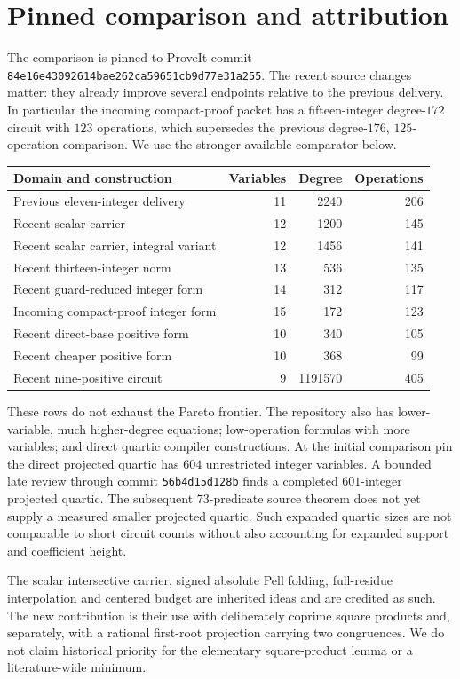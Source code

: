 \section{Pinned comparison and attribution}
The comparison is pinned to ProveIt commit
\texttt{84e16e43092614bae262ca59651cb9d77e31a255}.
The recent source changes matter: they already improve several endpoints
relative to the previous delivery. In particular the incoming compact-proof
packet has a fifteen-integer degree-$172$ circuit with $123$ operations,
which supersedes the previous degree-$176$, $125$-operation comparison.
We use the stronger available comparator below.

\begin{center}
\begin{tabular}{lrrr}
Domain and construction & Variables & Degree & Operations\\\hline
Previous eleven-integer delivery & 11 & 2240 & 206\\
Recent scalar carrier & 12 & 1200 & 145\\
Recent scalar carrier, integral variant & 12 & 1456 & 141\\
Recent thirteen-integer norm & 13 & 536 & 135\\
Recent guard-reduced integer form & 14 & 312 & 117\\
Incoming compact-proof integer form & 15 & 172 & 123\\
Recent direct-base positive form & 10 & 340 & 105\\
Recent cheaper positive form & 10 & 368 & 99\\
Recent nine-positive circuit & 9 & 1191570 & 405
\end{tabular}
\end{center}

These rows do not exhaust the Pareto frontier. The repository also has
lower-variable, much higher-degree equations; low-operation formulas with
more variables; and direct quartic compiler constructions. At the initial comparison pin the direct projected quartic has $604$
unrestricted integer variables. A bounded late review through commit
\texttt{56b4d15d128b} finds a completed $601$-integer projected quartic.
The subsequent $73$-predicate source theorem does not yet supply a measured
smaller projected quartic. Such expanded quartic sizes are not comparable
to short circuit counts without
also accounting for expanded support and coefficient height.

The scalar intersective carrier, signed absolute Pell folding,
full-residue interpolation and centered budget are inherited ideas and are
credited as such. The new contribution is their use with deliberately
coprime square products and, separately, with a rational first-root
projection carrying two congruences. We do not claim historical priority
for the elementary square-product lemma or a literature-wide minimum.

